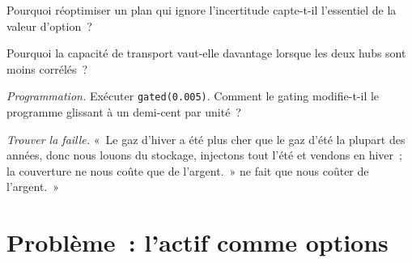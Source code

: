 \begin{exercise}[$\star\star$]\label{exo:s2:storage-transport-and-physical-optionality:5}
Pourquoi réoptimiser un plan qui ignore l'incertitude capte-t-il l'essentiel de la valeur d'option~?
\end{exercise}

\begin{exercise}[$\star\star$]\label{exo:s2:storage-transport-and-physical-optionality:6}
Pourquoi la capacité de transport vaut-elle davantage lorsque les deux hubs sont moins corrélés~?
\end{exercise}

\begin{exercise}[$\star\star\star$]\label{exo:s2:storage-transport-and-physical-optionality:7}
\emph{Programmation.} Exécuter \texttt{gated(0.005)}. Comment le gating modifie-t-il le programme glissant à un demi-cent par unité~?
\end{exercise}

\begin{exercise}[$\star\star\star$]\label{exo:s2:storage-transport-and-physical-optionality:8}
\emph{Trouver la faille.} «~Le gaz d'hiver a été plus cher que le gaz d'été la plupart des années, donc nous louons du stockage, injectons tout l'été et vendons en hiver~; la couverture ne nous coûte que de l'argent.~»
ne fait que nous coûter de l'argent.~»
\end{exercise}

\section{Problème~: l'actif comme options}

